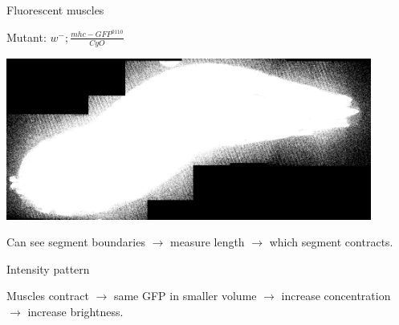 \documentclass{beamer}%
\begin{document}
\begin{frame}{Fluorescent muscles}
%
 \begin{center}
 Mutant: $w^-; \frac{mhc-GFP^{0110}}{CyO}$ 

 \includegraphics[width=12cm]{Figs/LarvaStitchScaled.png}
 \end{center}

 \vp Can see segment boundaries $\to$ measure length $\to$ which segment contracts.
%
\end{frame}


\begin{frame}{Intensity pattern}
%
  \begin{center}
  \end{center}

 Muscles contract $\rightarrow$ same GFP in smaller volume $\rightarrow$ increase
 concentration $\rightarrow$ increase brightness.

%
\end{frame}
\end{document}
